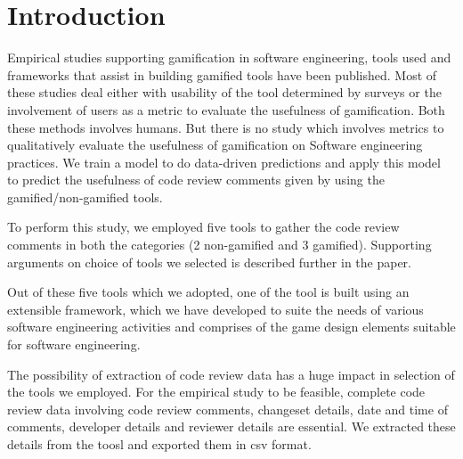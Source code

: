 \documentclass[conference]{IEEEtran}
\begin{document}




%


\section{Introduction}
Empirical studies supporting gamification in software engineering, tools used and frameworks that assist in building gamified tools have been published. Most of these studies deal either with usability of the tool determined by surveys or the involvement of users as a metric to evaluate the usefulness of gamification. Both these methods involves humans.  But there is no study which involves metrics to qualitatively evaluate the usefulness of gamification on Software engineering practices. We train a model to do data-driven predictions and apply this model to predict the usefulness of code review comments given by using the gamified/non-gamified tools. 

To perform this study, we employed five tools to gather the code review comments in both the categories (2 non-gamified and 3 gamified). Supporting arguments on choice of tools we selected is described further in the paper.

Out of these five tools which we adopted, one of the tool is built using an extensible framework, which we have developed to suite the needs of various software engineering activities and comprises of the game design elements\cite{what are game design elements paper} suitable for software engineering\cite{GDE suitable for SE paper}.

The possibility of extraction of code review data has a huge impact in selection of the tools we employed. For the empirical study to be feasible, complete code review data involving code review comments, changeset details, date and time of comments, developer details and reviewer details are essential. We extracted these details from the toosl and exported them in csv format. 
\end{document}
